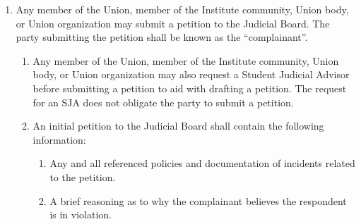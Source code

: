 \begin{enumerate}
\begin{enumerate}
\begin{enumerate}
          \item The Office of the Dean of Students governs the conduct of the SJA in all cases referred to the Judicial Board through the Institute’s conduct process.
        \end{enumerate}
      \item SJAs are governed by the following policies in civil and constitutional matters:
        \begin{enumerate}
          \item The SJA will act as the counsel for the assigned party.
          \item No SJA may act against the interests of the party to whom they are assigned. Breach of this duty constitutes grounds for immediate removal as SJA.
          \item The SJA cannot share any information with the Judicial Board without the party’s explicit consent.
          \item The SJA shall not vote as a Member of the Judicial Board in any proceeding in which a party to whom they are appointed is a party named in the case, nor shall they be present during deliberation.
          \item The SJA may attend inquiries and hearings with the consent of the Judicial Board and shall step out at any time upon the request of the Chairperson.
        \end{enumerate}
    \end{enumerate}
  \item Any member of the Union, member of the Institute community, Union body, or Union organization may submit a petition to the Judicial Board. The party submitting the petition shall be known as the ``complainant''.
    \begin{enumerate}
      \item Any member of the Union, member of the Institute community, Union body, or Union organization may also request a Student Judicial Advisor before submitting a petition to aid with drafting a petition. The request for an SJA does not obligate the party to submit a petition.
      \item An initial petition to the Judicial Board shall contain the following information:
        \begin{enumerate}
          \item Any and all referenced policies and documentation of incidents related to the petition.
          \item A brief reasoning as to why the complainant believes the respondent is in violation.

\end{enumerate}
\end{enumerate}
\end{enumerate}
